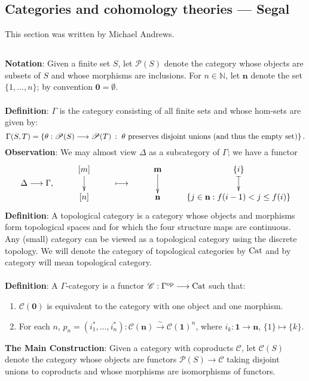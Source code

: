 \documentclass[11pt]{article}
\newcommand{\KanSemResponse}[1]
{
\thispagestyle{fancy}
\section{#1}
}
\begin{document}
\begin{Jandr GammaCat notes}
\KanSemResponse
{Categories and cohomology theories --- Segal}
This section was written by Michael Andrews.
\subsection{}
\textbf{Notation}: Given a finite set $S$, let $\mathscr{P}(S)$ denote the category whose objects are subsets of $S$ and whose morphisms are inclusions. For $n\in\mathbb{N}$, let $\textbf{n}$ denote the set $\{1,\ldots,n\}$; by convention $\textbf{0}=\emptyset$.
\\
\\
\textbf{Definition}: $\Gamma$ is the category consisting of all finite sets and whose hom-sets are given by:
\[\Gamma(S,T)=
\left\{
\theta:\mathscr{P}(S)\to\mathscr{P}(T)
\hspace{2pt} : \hspace{3pt}
\theta\textup{ preserves disjoint unions (and thus the empty set)}
\right\}.\]
\textbf{Observation}: We may almost view $\Delta$ as a subcategory of $\Gamma$; we have a functor
\[\xymatrixrowsep{1pt}\xymatrix{&[m]\ar[dd]& &\textbf{m}\ar[dd] 
&\{i\}\ar@{|->}[dd]\\
\Delta\to\Gamma, & &\mapsto & &\\
&[n]& &\textbf{n} &\{j\in\textbf{n}:f(i-1)<j\leq f(i)\}}\]
\textbf{Definition}: A topological category is a category whose objects and morphisms form topological spaces and for which the four structure maps are continuous. Any (small) category can be viewed as a topological category using the discrete topology. We will denote the category of topological categories by $\textup{Cat}$ and by category will mean topological category.\\
\\
\textbf{Definition}: A $\Gamma$-category is a functor 
$\mathscr{C}:\Gamma^{\textup{op}}\to\textup{Cat}$ such that:
\begin{enumerate}
\item $\mathscr{C}(\textbf{0})$ is equivalent to the category with one object and one morphism.
\item For each $n$, $p_n=(i_1^*,\ldots,i_n^*):
\mathscr{C}(\textbf{n})\overset{\sim}{\to}\mathscr{C}(\textbf{1})^n$, where $i_k:\textbf{1}\to\textbf{n}$, $\{1\}\mapsto \{k\}$.
\end{enumerate}
\phantom{poo}
\textbf{The Main Construction}: Given a category with coproducts $\mathscr{C}$, let $\mathscr{C}(S)$ denote the category whose objects are functors $\mathscr{P}(S)\to\mathscr{C}$ taking disjoint unions to coproducts and whose morphisms are isomorphisms of functors.\\

\end{Jandr GammaCat notes}
\end{document}
